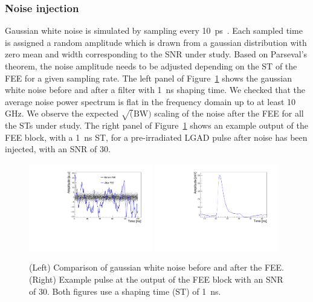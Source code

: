 \documentclass[preprint,1p]{elsarticle}
\begin{document}
\subsubsection{Noise injection}\label{sec:noise_simulation}
Gaussian white noise is simulated by sampling every 10~\si{ps}~\cite{Radeka}. Each
sampled time is assigned a random amplitude which is drawn from a gaussian distribution with zero mean and width corresponding to the SNR under study. Based on Parseval's theorem, the noise amplitude needs to be adjusted depending
on the ST of the FEE for a given sampling rate. The left panel of Figure~\ref{fig:noise} shows the gaussian white 
noise before and after a filter with 1~\si{ns} shaping time. We checked that the average noise power spectrum is flat in the frequency domain up to at least 10 GHz. We observe the expected $\sqrt(\mathrm{BW})$ scaling of the noise after
the FEE for all the STs under study. The right panel of Figure~\ref{fig:noise} shows an example output of the
FEE block, with a 1~\si{ns} ST, for a pre-irradiated LGAD pulse after noise has been injected, with an SNR of 30. 

\begin{figure}[htbp]
  \centering
  \includegraphics[width=0.48\textwidth]{figs/noise_vs_shaped_noise.pdf} \hfill
  \includegraphics[width=0.48\textwidth]{figs/lgad_pre_rad_st_1ns_snr_30.pdf}
  \caption{(Left) Comparison of gaussian white noise before and after the FEE.
  (Right) Example pulse at the output of the FEE block with an SNR of 30. Both figures use a shaping time (ST) of 1~\si{ns}.}
  \label{fig:noise}
\end{figure}
\end{document}
